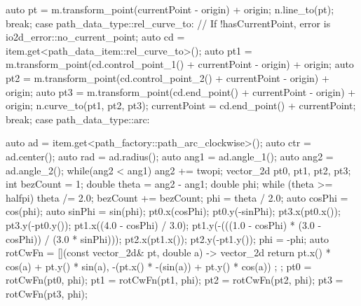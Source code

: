 \begin{codeblock}
{{{    auto pt = m.transform_point(currentPoint - origin) + origin;
    n.line_to(pt);
  } break;
  case path_data_type::rel_curve_to:
  {
    // If !hasCurrentPoint, error is io2d_error::no_current_point;
    auto cd = item.get<path_data_item::rel_curve_to>();
    auto pt1 = m.transform_point(cd.control_point_1() + currentPoint -
      origin) + origin;
    auto pt2 = m.transform_point(cd.control_point_2() + currentPoint -
      origin) + origin;
    auto pt3 = m.transform_point(cd.end_point() + currentPoint - origin) +
      origin;
    n.curve_to(pt1, pt2, pt3);
    currentPoint = cd.end_point() + currentPoint;
  } break;
  case path_data_type::arc:
  {
    auto ad = item.get<path_factory::path_arc_clockwise>();
    auto ctr = ad.center();
    auto rad = ad.radius();
    auto ang1 = ad.angle_1();
    auto ang2 = ad.angle_2();
    while(ang2 < ang1) {
      ang2 += twopi;
    }
    vector_2d pt0, pt1, pt2, pt3;
    int bezCount = 1;
    double theta = ang2 - ang1;
    double phi;
    while (theta >= halfpi) {
      theta /= 2.0;
      bezCount += bezCount;
    }
    phi = theta / 2.0;
    auto cosPhi = cos(phi);
    auto sinPhi = sin(phi);
    pt0.x(cosPhi);
    pt0.y(-sinPhi);
    pt3.x(pt0.x());
    pt3.y(-pt0.y());
    pt1.x((4.0 - cosPhi) / 3.0);
    pt1.y(-(((1.0 - cosPhi) * (3.0 - cosPhi)) / (3.0 * sinPhi)));
    pt2.x(pt1.x());
    pt2.y(-pt1.y());
    phi = -phi;
    auto rotCwFn = [](const vector_2d& pt, double a) -> vector_2d {
      return { pt.x() * cos(a) + pt.y() * sin(a),
        -(pt.x() * -(sin(a)) + pt.y() * cos(a)) };
    };
    pt0 = rotCwFn(pt0, phi);
    pt1 = rotCwFn(pt1, phi);
    pt2 = rotCwFn(pt2, phi);
    pt3 = rotCwFn(pt3, phi);
    
}}}
\end{codeblock}
